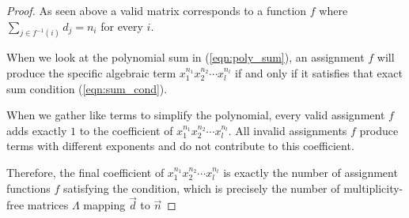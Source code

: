 \documentclass[12pt,a4paper]{amsart}
\theoremstyle{plain}
\theoremstyle{definition}
\theoremstyle{remark}
\numberwithin{equation}{section}
\theoremstyle{ser}
\theoremstyle{serr}
\theoremstyle{ser}
\theoremstyle{ser}
\theoremstyle{collabquestion}
\newcommand{\<}{\langle}
\renewcommand{\>}{\rangle}
\begin{document}
\begin{proof}
    As seen above a valid matrix corresponds to a function $f$ where $\sum_{j \in f^{-1}(i)} d_j = n_i$ for every $i$.
    
    When we look at the polynomial sum in (\ref{eqn:poly_sum}), an assignment $f$ will produce the specific algebraic term $x_1^{n_1} x_2^{n_2} \cdots x_l^{n_l}$ if and only if it satisfies that exact sum condition (\ref{eqn:sum_cond}). 

    When we gather like terms to simplify the polynomial, every valid assignment $f$ adds exactly $1$ to the coefficient of $x_1^{n_1} x_2^{n_2} \cdots x_l^{n_l}$. All invalid assignments $f$ produce terms with different exponents and do not contribute to this coefficient.

    Therefore, the final coefficient of $x_1^{n_1} x_2^{n_2} \cdots x_l^{n_l}$ is exactly the number of assignment functions $f$ satisfying the condition, which is precisely the number of multiplicity-free matrices $\Lambda$ mapping $\vec{d}$ to $\vec{n}$
\end{proof} 
\end{document}
